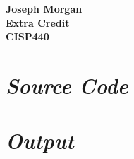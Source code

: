 \documentclass[12pt,titlepage]{article}
\begin{document}
\begin{titlepage}
	\centering
	\vfill
	{\bfseries\Large
		Joseph Morgan\\
		\large
		Extra Credit\\
		\vskip2cm
		CISP440\\
	}
	\vfill
	\vfill
	\vfill
\end{titlepage}
\section*{\textit{Source Code}}

\section*{\textit{Output}}

\end{document}
